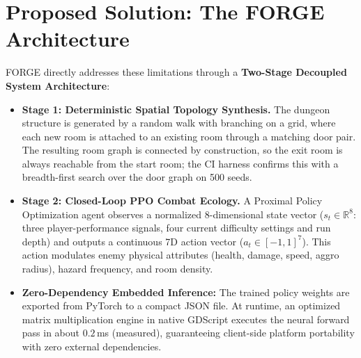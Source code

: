 \section{Proposed Solution: The FORGE Architecture}\label{sec:proposed}
FORGE directly addresses these limitations through a \textbf{Two-Stage Decoupled System Architecture}:
\begin{itemize}
    \item \textbf{Stage 1: Deterministic Spatial Topology Synthesis.} The dungeon structure is generated by a random walk with branching on a grid, where each new room is attached to an existing room through a matching door pair. The resulting room graph is connected by construction, so the exit room is always reachable from the start room; the CI harness confirms this with a breadth-first search over the door graph on 500 seeds.
    \item \textbf{Stage 2: Closed-Loop PPO Combat Ecology.} A Proximal Policy Optimization agent observes a normalized 8-dimensional state vector ($s_t \in \mathbb{R}^8$: three player-performance signals, four current difficulty settings and run depth) and outputs a continuous 7D action vector ($a_t \in [-1, 1]^7$). This action modulates enemy physical attributes (health, damage, speed, aggro radius), hazard frequency, and room density.
    \item \textbf{Zero-Dependency Embedded Inference:} The trained policy weights are exported from PyTorch to a compact JSON file. At runtime, an optimized matrix multiplication engine in native GDScript executes the neural forward pass in about $0.2$\,ms (measured), guaranteeing client-side platform portability with zero external dependencies.
\end{itemize}


